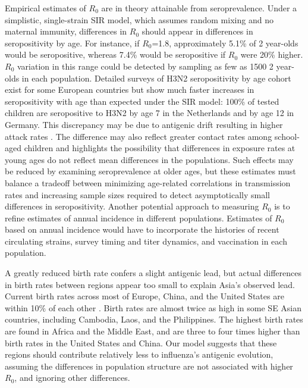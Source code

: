 \documentclass[10pt]{article}
\begin{document}
Empirical estimates of $R_0$ are in theory attainable from seroprevalence.
Under a simplistic, single-strain SIR model, which assumes random mixing and no maternal immunity, differences in $R_0$ should appear in differences in seropositivity by age.
For instance, if $R_0$=1.8, approximately 5.1\% of 2 year-olds would be seropositive, whereas 7.4\% would be seropositive if $R_0$ were 20\% higher.
$R_0$ variation in this range could be detected by sampling as few as 1500 2 year-olds in each population. 
Detailed surveys of H3N2 seropositivity by age cohort exist for some European countries \cite{Bodewes:2011fn, Sauerbrei:2009ic} but show much faster increases in seropositivity with age than expected under the SIR model: 100\% of tested children are seropositive to H3N2 by age 7 in the Netherlands and by age 12 in Germany.
This discrepancy may be due to antigenic drift resulting in higher attack rates \cite{Bedford:2015fj}.
The difference may also reflect greater contact rates among school-aged children \cite{Mossong:2008kk} and highlights the possibility that differences in exposure rates at young ages do not reflect mean differences in the populations. 
Such effects may be reduced by examining seroprevalence at older ages, but these estimates must balance a tradeoff between minimizing age-related correlations in transmission rates and increasing sample sizes required to detect asymptotically small differences in seropositivity. 
Another potential approach to measuring $R_0$ is to refine estimates of annual incidence in different populations.
Estimates of $R_0$ based on annual incidence would have to incorporate the histories of recent circulating strains, survey timing and titer dynamics, and vaccination in each population.

A greatly reduced birth rate confers a slight antigenic lead, but actual differences in birth rates between regions appear too small to explain Asia's observed lead. 
Current birth rates across most of Europe, China, and the United States are within 10\% of each other \cite{UN:2013}. 
Birth rates are almost twice as high in some SE Asian countries, including Cambodia, Laos, and the Philippines. 
The highest birth rates are found in Africa and the Middle East, and are three to four times higher than birth rates in the United States and China.
Our model suggests that these regions should contribute relatively less to influenza's antigenic evolution, assuming the differences in population structure are not associated with higher $R_0$, and ignoring other differences. 
\end{document}
